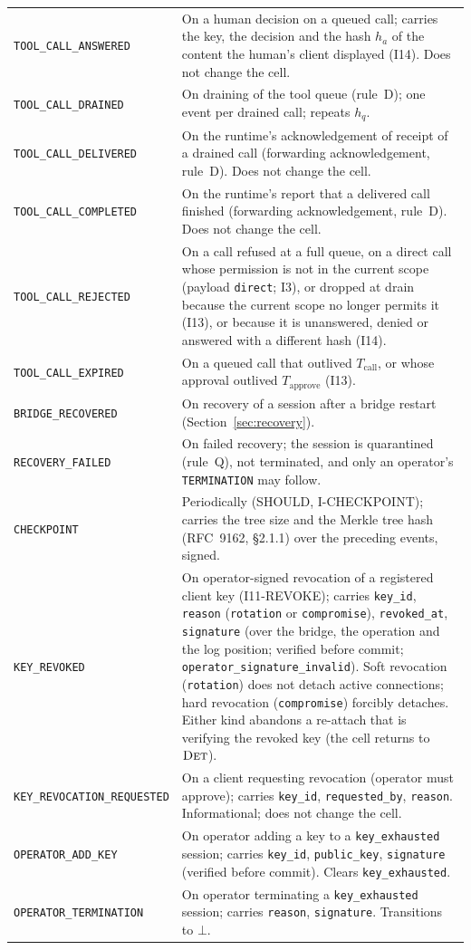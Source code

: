 \begin{longtable}{p{} p{}}
\texttt{TOOL\_CALL\_ANSWERED} & On a human decision on a queued call;
carries the key, the decision and the hash $h_a$ of the content the
human's client displayed (I14). Does not change the cell. \\
\texttt{TOOL\_CALL\_DRAINED} & On draining of the tool queue (rule~D);
one event per drained call; repeats $h_q$. \\
\texttt{TOOL\_CALL\_DELIVERED} & On the runtime's acknowledgement of
receipt of a drained call (forwarding acknowledgement, rule~D). Does not
change the cell. \\
\texttt{TOOL\_CALL\_COMPLETED} & On the runtime's report that a delivered
call finished (forwarding acknowledgement, rule~D). Does not change the
cell. \\
\texttt{TOOL\_CALL\_REJECTED} & On a call refused at a full queue, on a
direct call whose permission is not in the current scope (payload
\texttt{direct}; I3), or
dropped at drain because the current scope no longer permits it (I13),
or because it is unanswered, denied or answered with a different hash
(I14). \\
\texttt{TOOL\_CALL\_EXPIRED} & On a queued call that outlived
$T_{\text{call}}$, or whose approval outlived $T_{\text{approve}}$
(I13). \\
\texttt{BRIDGE\_RECOVERED} & On recovery of a session after a bridge
restart (Section~\ref{sec:recovery}). \\
\texttt{RECOVERY\_FAILED} & On failed recovery; the session is
quarantined (rule~Q), not terminated, and only an operator's
\texttt{TERMINATION} may follow. \\
\texttt{CHECKPOINT} & Periodically (SHOULD, I-CHECKPOINT); carries the
tree size and the Merkle tree hash (RFC~9162, \S2.1.1) over the preceding
events, signed. \\
\texttt{KEY\_REVOKED} & On operator-signed revocation of a registered
client key (I11-REVOKE); carries \texttt{key\_id}, \texttt{reason}
(\texttt{rotation} or \texttt{compromise}), \texttt{revoked\_at},
\texttt{signature} (over the bridge, the operation and the log position; verified before commit; \texttt{operator\_signature\_invalid}). Soft revocation (\texttt{rotation}) does not
detach active connections; hard revocation (\texttt{compromise})
forcibly detaches. Either kind abandons a re-attach that is verifying the
revoked key (the cell returns to $\textsc{Det}$). \\
\texttt{KEY\_REVOCATION\_REQUESTED} & On a client requesting
revocation (operator must approve); carries \texttt{key\_id},
\texttt{requested\_by}, \texttt{reason}. Informational; does not
change the cell. \\
\texttt{OPERATOR\_ADD\_KEY} & On operator adding a key to a
\texttt{key\_exhausted} session; carries \texttt{key\_id},
\texttt{public\_key}, \texttt{signature} (verified before commit). Clears
\texttt{key\_exhausted}. \\
\texttt{OPERATOR\_TERMINATION} & On operator terminating a
\texttt{key\_exhausted} session; carries \texttt{reason},
\texttt{signature}. Transitions to $\bot$. \\
\bottomrule
\end{longtable}

